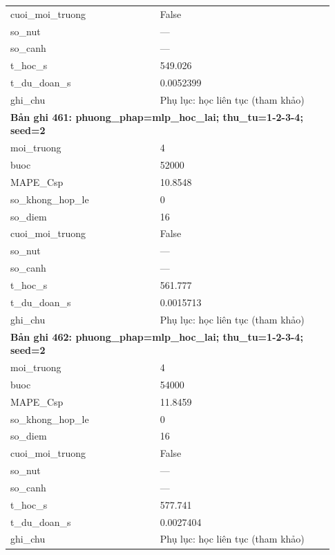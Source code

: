 \begin{longtable}{p{0.43\linewidth}p{0.50\linewidth}}
cuoi\_\allowbreak moi\_\allowbreak truong & False \\
so\_\allowbreak nut & — \\
so\_\allowbreak canh & — \\
t\_\allowbreak hoc\_\allowbreak s & 549.026 \\
t\_\allowbreak du\_\allowbreak doan\_\allowbreak s & 0.0052399 \\
ghi\_\allowbreak chu & Phụ lục: học liên tục (tham khảo) \\
\midrule
\multicolumn{2}{p{0.95\linewidth}}{\textbf{Bản ghi 461: phuong\_phap=mlp\_hoc\_lai; thu\_tu=1-2-3-4; seed=2}} \\
moi\_\allowbreak truong & 4 \\
buoc & 52000 \\
MAPE\_\allowbreak Csp & 10.8548 \\
so\_\allowbreak khong\_\allowbreak hop\_\allowbreak le & 0 \\
so\_\allowbreak diem & 16 \\
cuoi\_\allowbreak moi\_\allowbreak truong & False \\
so\_\allowbreak nut & — \\
so\_\allowbreak canh & — \\
t\_\allowbreak hoc\_\allowbreak s & 561.777 \\
t\_\allowbreak du\_\allowbreak doan\_\allowbreak s & 0.0015713 \\
ghi\_\allowbreak chu & Phụ lục: học liên tục (tham khảo) \\
\midrule
\multicolumn{2}{p{0.95\linewidth}}{\textbf{Bản ghi 462: phuong\_phap=mlp\_hoc\_lai; thu\_tu=1-2-3-4; seed=2}} \\
moi\_\allowbreak truong & 4 \\
buoc & 54000 \\
MAPE\_\allowbreak Csp & 11.8459 \\
so\_\allowbreak khong\_\allowbreak hop\_\allowbreak le & 0 \\
so\_\allowbreak diem & 16 \\
cuoi\_\allowbreak moi\_\allowbreak truong & False \\
so\_\allowbreak nut & — \\
so\_\allowbreak canh & — \\
t\_\allowbreak hoc\_\allowbreak s & 577.741 \\
t\_\allowbreak du\_\allowbreak doan\_\allowbreak s & 0.0027404 \\
ghi\_\allowbreak chu & Phụ lục: học liên tục (tham khảo) \\

\end{longtable}
